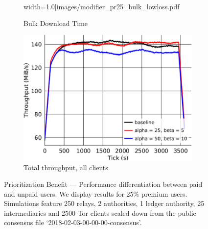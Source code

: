 \begin{figure}
\begin{subfigure}[t]{0.32\textwidth}
  width=1.0\textwidth]{images/modifier_pr25_bulk_lowloss.pdf}
		\caption{Bulk Download Time}
\label{fig:modifier_pr25_bulk}
	\end{subfigure}
	\begin{subfigure}[t]{0.32\textwidth} \centering
\includegraphics[trim={0 0cm 0 0cm}, clip,
  width=1.0\textwidth]{images/modifier_pr25_all_lowloss.pdf}
		\caption{Total throughput, all clients}
\label{fig:modifier_pr25_all}
	\end{subfigure}
	\caption{Prioritization Benefit --- Performance differentiation between
          paid and unpaid users. We display results for 25\% premium users.
          Simulations feature 250 relays, 2 authorities, 1 ledger authority, 25
          intermediaries and 2500 Tor clients scaled down from the public
          consensus file `2018-02-03-00-00-00-consensus'.}
\label{fig:modifier}
\end{figure}





